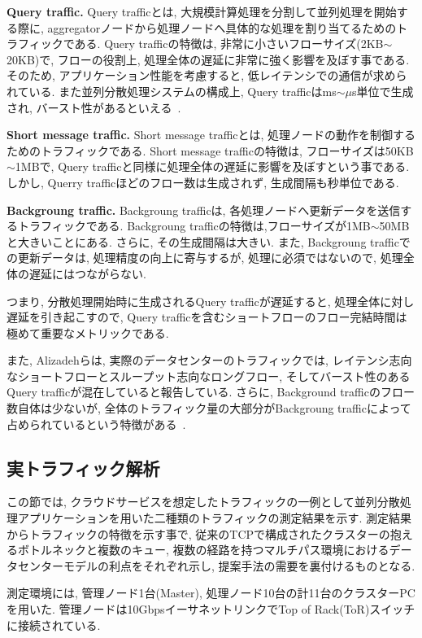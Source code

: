 \documentclass[11pt, a4paper, twocolumn]{jsarticle}
\begin{document}
{\bf Query traffic. }Query trafficとは, 大規模計算処理を分割して並列処理を開始する際に,
aggregatorノードから処理ノードへ具体的な処理を割り当てるためのトラフィックである.
Query trafficの特徴は, 非常に小さいフローサイズ(2KB$\sim$20KB)で,
フローの役割上, 処理全体の遅延に非常に強く影響を及ぼす事である.
そのため, アプリケーション性能を考慮すると, 低レイテンシでの通信が求められている.
また並列分散処理システムの構成上, Query trafficはms$\sim \mu$s単位で生成され,
バースト性があるといえる~\cite{dctcp}.

{\bf Short message traffic. } Short message trafficとは,
処理ノードの動作を制御するためのトラフィックである.
Short message trafficの特徴は, フローサイズは50KB$\sim$1MBで, Query
trafficと同様に処理全体の遅延に影響を及ぼすという事である.
しかし, Querry trafficほどのフロー数は生成されず, 生成間隔も秒単位である.

{\bf Backgroung traffic. }Backgroung trafficは,
各処理ノードへ更新データを送信するトラフィックである.
Backgroung trafficの特徴は,フローサイズが1MB$\sim$50MBと大きいことにある.
さらに, その生成間隔は大きい.
また, Backgroung trafficでの更新データは, 処理精度の向上に寄与するが, 処理に必須ではないので,
処理全体の遅延にはつながらない.

つまり, 分散処理開始時に生成されるQuery trafficが遅延すると,
処理全体に対し遅延を引き起こすので, Query trafficを含むショートフローのフロー完結時間は極めて重要なメトリックである.

また, Alizadehらは, 実際のデータセンターのトラフィックでは, レイテンシ志向なショートフローとスループット志向なロングフロー,
そしてバースト性のあるQuery trafficが混在していると報告している.
さらに, Background trafficのフロー数自体は少ないが,
全体のトラフィック量の大部分がBackgroung trafficによって占められているという特徴がある~\cite{traffic}.

\subsection{実トラフィック解析}
\label{sec:traffic_character}
この節では, クラウドサービスを想定したトラフィックの一例として並列分散処理アプリケーションを用いた二種類のトラフィックの測定結果を示す.
測定結果からトラフィックの特徴を示す事で, 従来のTCPで構成されたクラスターの抱えるボトルネックと複数のキュー,
複数の経路を持つマルチパス環境におけるデータセンターモデルの利点をそれぞれ示し, 提案手法の需要を裏付けるものとなる.

測定環境には, 管理ノード1台(Master), 処理ノード10台の計11台のクラスターPCを用いた.
管理ノードは10GbpsイーサネットリンクでTop of Rack(ToR)スイッチに接続されている.
\end{document}
